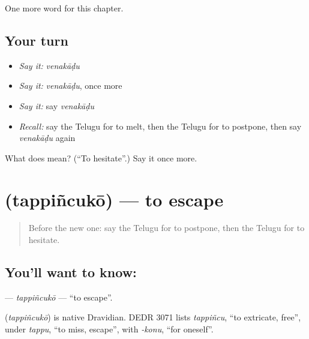 \begin{grammarlens}[title={What you've built}]
One more word for this chapter.
\end{grammarlens}

\subsection*{Your turn}
\begin{itemize}
\raggedright
  \item \emph{Say it:} \emph{venakāḍu}
  \item \emph{Say it:} \emph{venakāḍu}, once more
  \item \emph{Say it:} say \emph{venakāḍu}
  \item \emph{Recall:} say the Telugu for to melt, then the Telugu for to postpone, then say \emph{venakāḍu} again
\end{itemize}

\begin{tcolorbox}[breakable,colback=teal!4,colframe=teal!35!black,title={Before you move on}]
What does  mean? (\textquotedblleft{}To hesitate\textquotedblright{}.) Say it once more.
\end{tcolorbox}
\section[\texorpdfstring{\te{తప్పించుకో} (tappiñcukō)}{తప్పించుకో (tappiñcukō)}]{ (tappiñcukō) — to escape}

\label{lesson:TE-C286-tappincuko}



\begin{quote}
Before the new one: say the Telugu for to postpone, then the Telugu for to hesitate.
\end{quote}

\subsection*{You'll want to know: }
\textbf{} — \emph{tappiñcukō} — \textquotedblleft{}to escape\textquotedblright{}.

\begin{cousinweb}
\textbf{} (\emph{tappiñcukō}) is native Dravidian. DEDR 3071 lists \emph{tappiñcu}, \textquotedblleft{}to extricate, free\textquotedblright{}, under \emph{tappu}, \textquotedblleft{}to miss, escape\textquotedblright{}, with \emph{-konu}, \textquotedblleft{}for oneself\textquotedblright{}.
\end{cousinweb}

